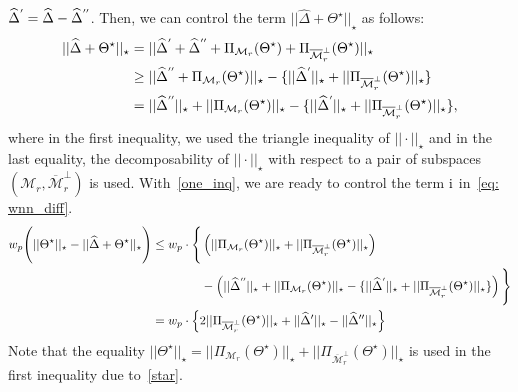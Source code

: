 \documentclass[12pt]{article}
\newcommand*{\myprime}{^{\prime}\mkern-1.2mu}
\newcommand*{\mydprime}{^{\prime\prime}\mkern-1.2mu}
\newcommand{\RN}[1]{%
  \textup{\uppercase\expandafter{\romannumeral#1}}%
}
\begin{document}
$\widehat{\Delta}^{\myprime}=\widehat{\Delta}-\widehat{\Delta}^{\mydprime}$.
Then, we can control the term $||\widehat{\Delta} + \Theta^{\star}||_{\star}$ as follows: 
\begin{align}
    ||\widehat{\Delta} + \Theta^{\star}||_{\star} & =  ||\widehat{\Delta}^{\myprime} + \widehat{\Delta}^{\mydprime} + \Pi_{\mathcal{M}_{r}}(\Theta^{\star}) + \Pi_{\overline{\mathcal{M}}_{r}^{\perp}}(\Theta^{\star})||_{\star}\nonumber \\
    & \geq  ||\widehat{\Delta}^{\mydprime} + \Pi_{\mathcal{M}_{r}}(\Theta^{\star})||_{\star} - \{||\widehat{\Delta}^{\myprime}||_{\star} + ||\Pi_{\overline{\mathcal{M}}_{r}^{\perp}}(\Theta^{\star})||_{\star}\} \nonumber\\
    & =  ||\widehat{\Delta}^{\mydprime}||_{\star} + ||\Pi_{\mathcal{M}_{r}}(\Theta^{\star})||_{\star} - \{||\widehat{\Delta}^{\myprime}||_{\star} + ||\Pi_{\overline{\mathcal{M}}_{r}^{\perp}}(\Theta^{\star})||_{\star}\} \label{one_inq},
\end{align}
where in the first inequality, we used the triangle inequality of $||\cdot||_{\star}$ and in the last equality, the decomposability of $||\cdot||_{\star}$ with respect to a pair of subspaces $(\mathcal{M}_{r},\overline{\mathcal{M}}_{r}^{\perp})$ is used.
With~\eqref{one_inq}, we are ready to control the term $\RN{1}$ in~\eqref{eq: wnn_diff}.
\begin{align}
    w_{p}\Bigg( ||\Theta^{\star}||_{\star} - ||\widehat{\Delta} + \Theta^{\star}||_{\star} \Bigg) 
    & \leq  w_{p} \cdot \Bigg\{ \left( ||\Pi_{\mathcal{M}_{r}}(\Theta^{\star})||_{\star} + ||\Pi_{\overline{\mathcal{M}}_{r}^{\perp}}(\Theta^{\star})||_{\star} \right) \nonumber \\ 
    &\qquad \qquad - \left(||\widehat{\Delta}^{\mydprime}||_{\star} + ||\Pi_{\mathcal{M}_{r}}(\Theta^{\star})||_{\star} - \{||\widehat{\Delta}^{\myprime}||_{\star} + ||\Pi_{\overline{\mathcal{M}}_{r}^{\perp}}(\Theta^{\star})||_{\star}\} \right) \Bigg\} \nonumber \\
    & =  w_{p} \cdot \left\lbrace 2||\Pi_{\overline{\mathcal{M}}_{r}^{\perp}}(\Theta^{\star})||_{\star} + ||\widehat{\Delta}'||_{\star} - ||\widehat{\Delta}''||_{\star} \right\rbrace \label{eq: wnn_diff_1}
\end{align}
Note that the equality $||\Theta^\star||_{\star}=||\Pi_{\mathcal{M}_{r}}(\Theta^{\star})||_{\star} + ||\Pi_{\overline{\mathcal{M}}_{r}^{\perp}}(\Theta^{\star})||_{\star}$ is used in the first inequality due to~\eqref{star}.
\end{document}
